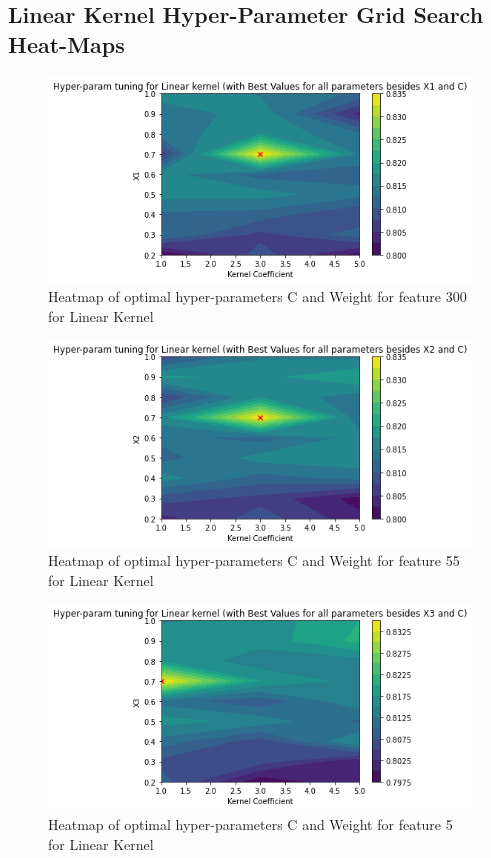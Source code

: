 \subsection{Linear Kernel Hyper-Parameter Grid Search Heat-Maps}\label{app:lin_hp}
\begin{figure}[h!]
    \centering
    \includegraphics[width=\textwidth]{figures/final/linear_x1.png}
    \caption{\label{fig:lin_300} Heatmap of optimal hyper-parameters C and Weight for feature 300 for Linear Kernel}
\end{figure}
\begin{figure}[h!]
    \centering
    \includegraphics[width=\textwidth]{figures/final/linear_x2.png}
    \caption{\label{fig:lin_55} Heatmap of optimal hyper-parameters C and Weight for feature 55 for Linear Kernel}
\end{figure}
\begin{figure}[h!]
    \centering
    \includegraphics[width=\textwidth]{figures/final/linear_x3.png}
    \caption{\label{fig:lin_5} Heatmap of optimal hyper-parameters C and Weight for feature 5 for Linear Kernel}
\end{figure}
